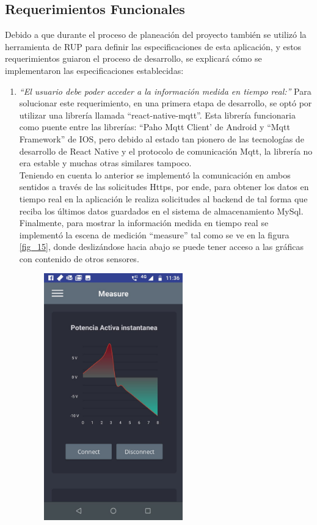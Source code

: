 \subsection{Requerimientos Funcionales}

Debido a que durante el proceso de planeación del proyecto también se utilizó la herramienta de RUP para definir las especificaciones de esta aplicación, y estos requerimientos guiaron el proceso de desarrollo, se explicará cómo se implementaron las especificaciones establecidas:

\begin{enumerate}
	\item \textsl{``El usuario debe poder acceder a la información medida en tiempo real:''} Para solucionar este requerimiento, en una primera etapa de desarrollo, se optó por utilizar una librería llamada ``react-native-mqtt''. Esta librería funcionaria como puente entre las librerías: ``Paho Mqtt Client' de Android y ``Mqtt Framework'' de IOS, pero debido al estado tan pionero de las tecnologías de desarrollo de React Native y el protocolo de comunicación Mqtt, la librería no era estable y muchas otras similares tampoco. 
	\vspace{0.5cm}\\
	Teniendo en cuenta lo anterior se implementó la comunicación en ambos sentidos a través de las solicitudes Https, por ende, para obtener los datos en tiempo real en la aplicación le realiza solicitudes al backend de tal forma que reciba los últimos datos guardados en el sistema de almacenamiento MySql.
	\vspace{0.5cm}\\
	Finalmente, para mostrar la información medida en tiempo real se implementó la escena de medición ``measure'' tal como se ve en la figura \ref{fig_15}, donde deslizándose hacia abajo se puede tener acceso a las gráficas con contenido de otros sensores.
	\begin{figure}[htbp]
		\centerline{\includegraphics[width=6cm]{./figuras/mobile_measure.jpeg}}

\end{figure}
\end{enumerate}
